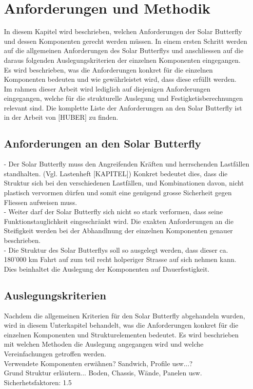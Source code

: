 \section{Anforderungen und Methodik}
In diesem Kapitel wird beschrieben, welchen Anforderungen der Solar Butterfly und dessen Komponenten gerecht werden müssen. In einem ersten Schritt werden auf die allgemeinen Anforderungen des Solar Butterflys und anschliessen auf die daraus folgenden Auslegungskriterien der einzelnen Komponenten eingegangen. Es wird beschrieben, was die Anforderungen konkret für die einzelnen Komponenten bedeuten und wie gewährleistet wird, dass diese erfüllt werden.\\
Im rahmen dieser Arbeit wird lediglich auf diejenigen Anforderungen eingegangen, welche für die strukturelle Auslegung und Festigketisberechnungen relevant sind. Die komplette Liste der Anforderungen an den Solar Butterfly ist in der Arbeit von [HUBER] zu finden.

\subsection{Anforderungen an den Solar Butterfly}
- Der Solar Butterfly muss den Angreifenden Kräften und herrschenden Lastfällen standhalten. (Vgl. Lastenheft [KAPITEL]) Konkret bedeutet dies, dass die Struktur sich bei den verschiedenen Lastfällen, und Kombinationen davon, nicht plastisch vervormen dürfen und somit eine genügend grosse Sicherheit gegen Fliessen aufweisen muss.\\
- Weiter darf der Solar Butterfly sich nicht so stark verformen, dass seine Funktionstauglichkeit eingeschränkt wird. Die exakten Anforderungen an die Steifigkeit werden bei der Abhandlnung der einzelnen Komponenten genauer beschrieben.\\
- Die Struktur des Solar Butterflys soll so ausgelegt werden, dass dieser ca. 180'000 km Fahrt auf zum teil recht holperiger Strasse auf sich nehmen kann. Dies beinhaltet die Auslegung der Komponenten auf Dauerfestigkeit.

\subsection{Auslegungskriterien}
Nachdem die allgemeinen Kriterien für den Solar Butterfly abgehandeln wurden, wird in diesem Unterkapitel behandelt, was die Anforderungen konkret für die einzelnen Komponenten und Strukturelementen bedeutet. Es wird beschrieben mit welchen Methoden die Auslegung angegangen wird und welche Vereinfachungen getroffen werden.\\
Verwendete Komponenten erwähnen? Sandwich, Profile usw...?\\
Grund Struktur erläutern... Boden, Chassis, Wände, Panelen usw.\\
Sicherhetsfaktoren: 1.5\\

